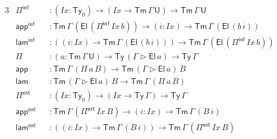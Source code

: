 \documentclass[12pt,a4paper,twoside,openany]{book}
\theoremstyle{remark}
\theoremstyle{definition}
\theoremstyle{theorem}
\newcommand{\mi}[1]{\mathit{#1}}
\newcommand{\ms}[1]{\mathsf{#1}}
\newcommand{\Tm}{\mathsf{Tm}}
\newcommand{\Ty}{\mathsf{Ty}}
\newcommand{\U}{\mathsf{U}}
\newcommand{\El}{\mathsf{El}}
\newcommand{\ext}{\triangleright}
\newcommand{\Pie}{\Pi^{\mathsf{ext}}}
\newcommand{\appe}{\mathsf{app^{ext}}}
\newcommand{\lame}{\mathsf{lam^{ext}}}
\newcommand{\Piinf}{\Pi^{\mathsf{inf}}}
\newcommand{\appinf}{\mathsf{app^{inf}}}
\newcommand{\laminf}{\mathsf{lam^{inf}}}
\newcommand{\app}{\ms{app}}
\newcommand{\lam}{\ms{lam}}
\begin{document}
\begin{alignat*}{3}
  &\Piinf &&: (\mi{Ix} : \Ty_0) \to (\mi{Ix} \to \Tm\,\Gamma\,\U) \to \Tm\,\Gamma\,\U\\
  &\appinf &&: \Tm\,\Gamma\,(\El\,(\Piinf\,\mi{Ix}\,b)) \to (i : \mi{Ix}) \to \Tm\,\Gamma\,(\El\,(b\,i))\\
  &\laminf &&: ((i : \mi{Ix}) \to \Tm\,\Gamma\,(\El\,(b\,i))) \to \Tm\,\Gamma\,(\El\,(\Piinf\,\mi{Ix}\,b))\\
  &\Pi &&: (a : \Tm\,\Gamma\,\U) \to \Ty\,(\Gamma\ext \El\,a) \to \Ty\,\Gamma\\
  &\app &&: \Tm\,\Gamma\,(\Pi\,a\,B) \to \Tm\,(\Gamma \ext \El\,a)\,B\\
  &\lam &&: \Tm\,(\Gamma \ext \El\,a)\,B \to \Tm\,\Gamma\,(\Pi\,a\,B)\\
  &\Pie &&: (\mi{Ix} : \Ty_0) \to (\mi{Ix} \to \Ty\,\Gamma) \to \Ty\,\Gamma\\
  &\appe &&: \Tm\,\Gamma\,(\Pie\,\mi{Ix}\,B) \to (i : \mi{Ix}) \to \Tm\,\Gamma\,(B\,i)\\
  &\lame &&: ((i : \mi{Ix}) \to \Tm\,\Gamma\,(B\,i)) \to \Tm\,\Gamma\,(\Pie\,\mi{Ix}\,B)
\end{alignat*}
\end{document}
